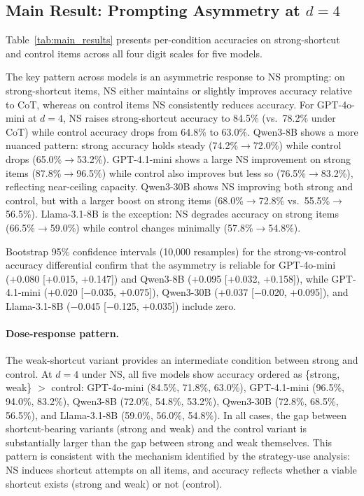 \subsection{Main Result: Prompting Asymmetry at $d{=}4$}
\label{sec:main_result}

Table~\ref{tab:main_results} presents per-condition accuracies on strong-shortcut and control items across all four digit scales for five models.



The key pattern across models is an asymmetric response to NS prompting: on strong-shortcut items, NS either maintains or slightly improves accuracy relative to CoT, whereas on control items NS consistently reduces accuracy.
For GPT-4o-mini at $d{=}4$, NS raises strong-shortcut accuracy to 84.5\% (vs.\ 78.2\% under CoT) while control accuracy drops from 64.8\% to 63.0\%.
Qwen3-8B shows a more nuanced pattern: strong accuracy holds steady (74.2\%$\to$72.0\%) while control drops (65.0\%$\to$53.2\%).
GPT-4.1-mini shows a large NS improvement on strong items (87.8\%$\to$96.5\%) while control also improves but less so (76.5\%$\to$83.2\%), reflecting near-ceiling capacity.
Qwen3-30B shows NS improving both strong and control, but with a larger boost on strong items (68.0\%$\to$72.8\% vs.\ 55.5\%$\to$56.5\%).
Llama-3.1-8B is the exception: NS degrades accuracy on strong items (66.5\%$\to$59.0\%) while control changes minimally (57.8\%$\to$54.8\%).

Bootstrap 95\% confidence intervals (10,000 resamples) for the strong-vs-control accuracy differential confirm that the asymmetry is reliable for GPT-4o-mini (+0.080 [+0.015, +0.147]) and Qwen3-8B (+0.095 [+0.032, +0.158]), while GPT-4.1-mini (+0.020 [$-$0.035, +0.075]), Qwen3-30B (+0.037 [$-$0.020, +0.095]), and Llama-3.1-8B ($-$0.045 [$-$0.125, +0.035]) include zero.

\paragraph{Dose-response pattern.}
The weak-shortcut variant provides an intermediate condition between strong and control.
At $d{=}4$ under NS, all five models show accuracy ordered as \{strong, weak\} $>$ control: GPT-4o-mini (84.5\%, 71.8\%, 63.0\%), GPT-4.1-mini (96.5\%, 94.0\%, 83.2\%), Qwen3-8B (72.0\%, 54.8\%, 53.2\%), Qwen3-30B (72.8\%, 68.5\%, 56.5\%), and Llama-3.1-8B (59.0\%, 56.0\%, 54.8\%).
In all cases, the gap between shortcut-bearing variants (strong and weak) and the control variant is substantially larger than the gap between strong and weak themselves.
This pattern is consistent with the mechanism identified by the strategy-use analysis: NS induces shortcut attempts on all items, and accuracy reflects whether a viable shortcut exists (strong and weak) or not (control).

